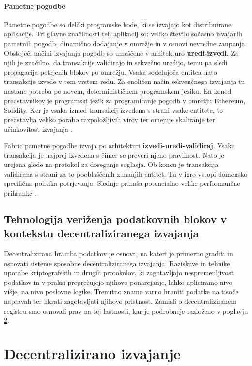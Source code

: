\documentclass[a4paper, 12pt]{book}
\begin{document}
\subsubsection{Pametne pogodbe}
Pametne pogodbe so delčki programske kode, ki se izvajajo kot distribuirane aplikacije.
Tri glavne značilnosti teh aplikacij so: veliko število sočasno izvajanih pametnih pogodb, dinamično dodajanje v omrežje in v osnovi nevredne zaupanja.
Obstoječi načini izvajanja pogodb so umeščene v arhitekturo \textbf{uredi-izvedi}.
Za njih je značilno, da transakcije validirajo in sekvečno uredijo, temu pa sledi propagacija potrjenih blokov po omrežju.
Vsaka sodelujoča entitea nato transakcije izvede v tem vrstem redu.
Za enoličen način sekvenčnega izvajanja tu nastane potreba po novem, determinističnem programskem jeziku.
En izmed predstavnikov je programski jezik za programiranje pogodb v omrežju Ethereum, Solidity.
Ker je vsaka izmed transakcij izvedena s strani vsake entitete, to predstavlja veliko porabo razpoložljivih virov ter omejuje skaliranje ter učinkovitost izvajanja \cite{hyperledgerDocs}.

Fabric pametne pogodbe izvaja po arhitekturi \textbf{izvedi-uredi-validiraj}.
Vsaka transakcija je najprej izvedena s čimer se preveri njeno pravilnost.
Nato je urejena glede na protokol za doseganje soglasja.
Ob koncu je transakcija validirana s strani za to pooblaščenih zunanjih entitet.
Tu v igro vstopi domensko specifična politika potrjevanja.
Slednje prinaša potencialno velike performančne prihranke \cite{hyperledgerDocs}.

\section{Tehnologija veriženja podatkovnih blokov v kontekstu decentraliziranega izvajanja}
Decentralizirana hramba podatkov je osnova, na kateri je primerno graditi in osnovati sisteme sposobne decentraliziranega izvajanja.
Raziskave in tehnike uporabe kriptografskih in drugih protokolov, ki zagotavljajo nespremenljivost podatkov in v praksi preprečujejo njihovo ponarejanje, lahko apliciramo nivo višje, na nivo poslovne logike.
Trenutno znamo varno hraniti podatke na tisoče napravah ter hkrati zagotavljati njihovo pristnost.
Zamisli o decentraliziranem registru smo osnovali prav na tej lastnosti, kar je podrobneje razloženo v poglavju \ref{ch4}.

\chapter{Decentralizirano izvajanje}
\label{ch4}
\end{document}
